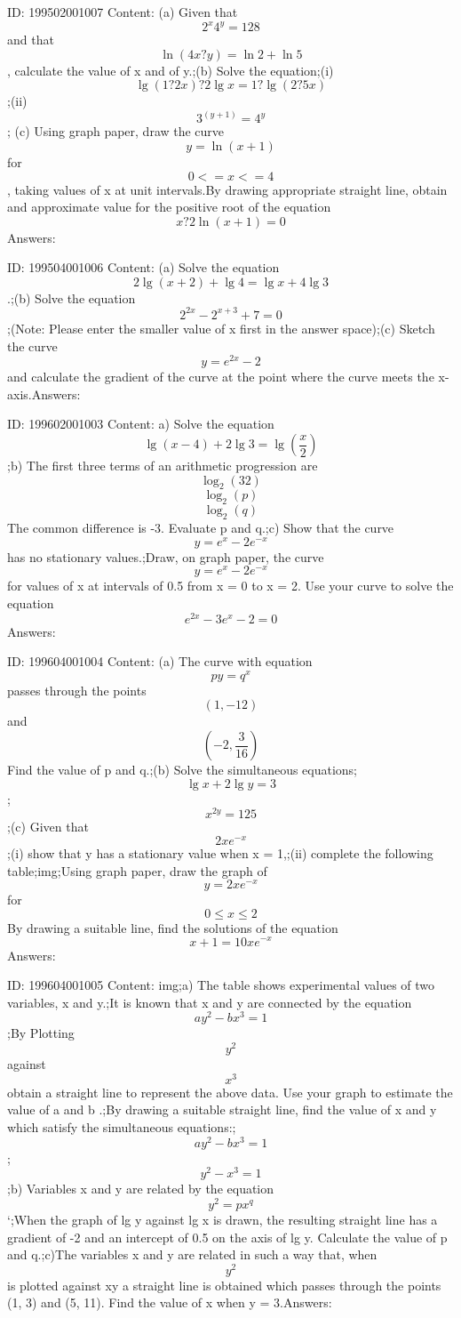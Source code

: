 \documentclass{article}
\begin{document}
ID: 199502001007
Content:
(a) Given that \[2^{x}4^{y}= 128\] and that \[\ln \left (  4x ? y\right )=\ln 2+\ln 5\], calculate the value of x and of y.;(b) Solve the equation;(i) \[\lg \left (  1 ? 2x\right )? 2\lg x= 1 ? \lg \left (2 ? 5x  \right )\];(ii)\[3^{\left ( y+1 \right )}=4^{y}\]; (c) Using graph paper, draw the curve \[y =\ln \left (  x + 1\right )\] for \[0<=x<=4\], taking values of x at unit intervals.By drawing appropriate straight line, obtain and approximate value for the positive root of the equation \[x ? 2\ln \left ( x + 1 \right )= 0\]Answers:

ID: 199504001006
Content:
(a) Solve the equation \[2 \lg(x + 2) + \lg 4 = \lg x + 4 \lg 3\].;(b) Solve the equation \[2^{2x}-2^{x+3}+7=0\];(Note: Please enter the smaller value of x first in the answer space);(c)    Sketch the curve \[y=e^{2x}-2\] and calculate the gradient of the curve at the point where the curve meets the x-axis.Answers:

ID: 199602001003
Content:
a) Solve the equation \[\lg (x-4)+2\lg 3 = \lg(\frac{x}{2})\] ;b) The first three terms of an arithmetic progression are \[\log_2(32)\] \[\log_2(p)\] \[\log_2(q)\]  The common difference is -3. Evaluate p and q.;c) Show that the curve \[y=e^x-2e^{-x}\]  has no stationary values.;Draw, on graph paper, the curve \[y=e^x-2e^{-x}\]   for values of x at intervals of 0.5 from x = 0 to x = 2. Use your curve to solve the equation \[e^{2x}-3e^x-2=0\]Answers:

ID: 199604001004
Content:
(a)	The curve with equation \[py=q^x\] passes through the points \[(1, -12) \]and \[(-2,\frac{3}{16})\] Find the value of p and q.;(b)	Solve the simultaneous equations; \[\lg x+2\lg y=3\]; \[x^{2y}=125\] ;(c)	Given that \[2xe^{-x}\];(i)	show that y has a stationary value when x = 1,;(ii)	complete the following table;img;Using graph paper, draw the graph of \[y=2xe^{-x}\] for \[0\leq x\leq 2\]  By drawing a suitable line, find the solutions of the equation \[x+1=10xe^{-x}\]Answers:

ID: 199604001005
Content:
img;a) The table shows experimental values of two variables, x and y.;It is known that x and y are connected by the equation \[ay^2-bx^3=1\];By Plotting \[y^2\] against \[x^3\] obtain a straight line to represent the above data. Use your graph to estimate the value of a and b .;By drawing a suitable straight line, find the value of x and y which satisfy the simultaneous equations:; \[ay^2-bx^3=1\] ; \[y^2-x^3=1\];b) Variables x and y are related by the equation \[y^2 = px^q\] `;When the graph of lg y against lg x is drawn, the resulting straight line has a gradient of -2 and an intercept of 0.5 on the axis of lg y. Calculate the value of p and q.;c)The variables x and y are related in such a way that, when \[y^2\] is plotted against xy a straight line is obtained which passes through the points (1, 3) and (5, 11). Find the value of x when y = 3.Answers:
\end{document}
